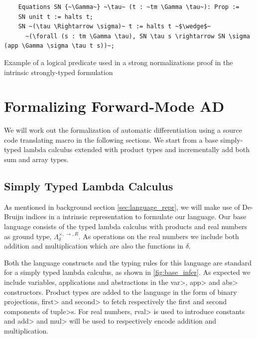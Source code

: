 \documentclass[11pt, final]{article}
\begin{document}
\begin{listing}
  \begin{verbatim}
    Equations SN {~\Gamma~} ~\tau~ (t : ~tm \Gamma \tau~): Prop :=
    SN unit t := halts t;
    SN ~(\tau \Rightarrow \sigma)~ t := halts t ~$\wedge$~
      ~(\forall (s : tm \Gamma \tau), SN \tau s \rightarrow SN \sigma (app \Gamma \sigma \tau t s))~;
  \end{verbatim}
  \caption{Example of a logical predicate used in a strong normalizations proof in the intrinsic strongly-typed formulation}
  \label{lst:sn_logical_relation}
\end{listing}

\section{Formalizing Forward-Mode AD}
  We will work out the formalization of automatic differentiation using a source code translating macro in the following sections.
  We start from a base simply-typed lambda calculus extended with product types and incrementally add both sum and array types.

  \subsection{Simply Typed Lambda Calculus}
  As mentioned in background section \ref{sec:language_repr}, we will make use of De-Bruijn indices in a intrinsic representation to formulate our language.
  Our base language consists of the typed lambda calculus with products and real numbers as ground type, $\Lambda_{\delta}^{\times, \rightarrow, R}$.
  As operations on the real numbers we include both addition and multiplication which are also the functions in $\delta$.

  Both the language constructs and the typing rules for this language are standard for a simply typed lambda calculus, as shown in \ref{fig:base_infer}.
  As expected we include variables, applications and abstractions in the \<var>, \<app> and \<abs> constructors.
  Product types are added to the language in the form of binary projections, \<first> and \<second> to fetch respectively the first and second components of \<tuple>s.
  For real numbers, \<rval> is used to introduce constants and \<add> and \<mul> will be used to respectively encode addition and multiplication.
\end{document}
